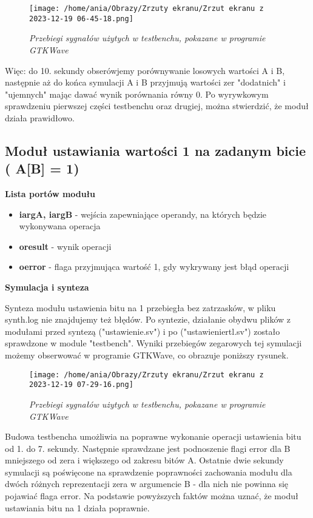 \documentclass[12pt]{article}
\begin{document}
\begin{figure}[h]
  \centering
  \texttt{[image: /home/ania/Obrazy/Zrzuty ekranu/Zrzut ekranu z 2023-12-19 06-45-18.png]}
  \centering
  \caption{\textit{Przebiegi sygnałów użytych w testbenchu, pokazane w programie GTKWave}}
  \end{figure}

Więc: do 10. sekundy obserówjemy porównywanie losowych wartości A i B, następnie aż do końca symulacji
A i B przyjmują wartości zer "dodatnich" i "ujemnych" mając dawać wynik porównania równy 0.
Po wyrywkowym sprawdzeniu pierwszej części testbenchu oraz drugiej, można stwierdzić, że moduł działa prawidłowo.
\subsection{Moduł ustawiania wartości 1 na zadanym bicie 
\\(\raisebox{-0.5ex}{\textasciitilde} A[B] = 1)}

\textbf{Lista portów modułu}
\begin{itemize}
  \item \textbf{i\textunderscore arg\textunderscore A, i\textunderscore arg\textunderscore B} - wejścia zapewniające 
  operandy, na których będzie wykonywana operacja
  \item \textbf{o\textunderscore result} - wynik operacji
  \item \textbf{o\textunderscore error} - flaga przyjmująca wartość 1, gdy wykrywany jest błąd operacji
\end{itemize}

\textbf{Symulacja i synteza}

Synteza modułu ustawienia bitu na 1 przebiegła bez zatrzasków, w pliku synth.log nie znajdujemy też błędów. Po syntezie, działanie
obydwu plików z modułami przed syntezą ("ustawienie.sv") i po ("ustawienie\textunderscore rtl.sv") zostało sprawdzone w module "testbench".
Wyniki przebiegów zegarowych tej symulacji możemy obserwować w programie GTKWave, co obrazuje poniższy rysunek.

\begin{figure}[h]
  \centering
  \texttt{[image: /home/ania/Obrazy/Zrzuty ekranu/Zrzut ekranu z 2023-12-19 07-29-16.png]}
  \centering
  \caption{\textit{Przebiegi sygnałów użytych w testbenchu, pokazane w programie GTKWave}}
  \end{figure}

  Budowa testbencha umożliwia na poprawne wykonanie operacji ustawienia bitu od 1. do 7. sekundy. Następnie sprawdzane 
  jest podnoszenie flagi error dla B mniejszego od zera i większego od zakresu bitów A. Ostatnie dwie sekundy symulacji są poświęcone
  na sprawdzenie poprawności zachowania modułu dla dwóch różnych reprezentacji zera w argumencie B - dla nich nie powinna się 
  pojawiać flaga error. Na podstawie powyższych faktów można uznać, że moduł ustawiania bitu na 1 działa poprawnie.
\end{document}
